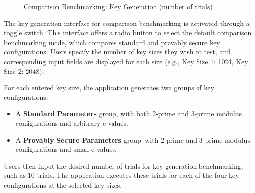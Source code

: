 \documentclass[]{final_report}
\begin{document}
\begin{figure}[H]
     \begin{minipage}{0.55\textwidth}
        \centering
       \caption{Comparison Benchmarking: Key Generation (number of trials)}
        \label{fig:image2}
    \end{minipage}
\end{figure}
The key generation interface for comparison benchmarking is activated through a toggle switch. This interface offers a radio button to select the default comparison benchmarking mode, which compares standard and provably secure key configurations. Users specify the number of key sizes they wish to test, and corresponding input fields are displayed for each size (e.g., Key Size 1: 1024, Key Size 2: 2048).

For each entered key size, the application generates two groups of key configurations:
\begin{itemize}
    \item A \textbf{Standard Parameters} group, with both 2-prime and 3-prime modulus configurations and arbitrary e values.
    \item A \textbf{Provably Secure Parameters} group, with 2-prime and 3-prime modulus configurations and small e values.
\end{itemize}

Users then input the desired number of trials for key generation benchmarking, such as 10 trials. The application executes these trials for each of the four key configurations at the selected key sizes.
\end{document}

